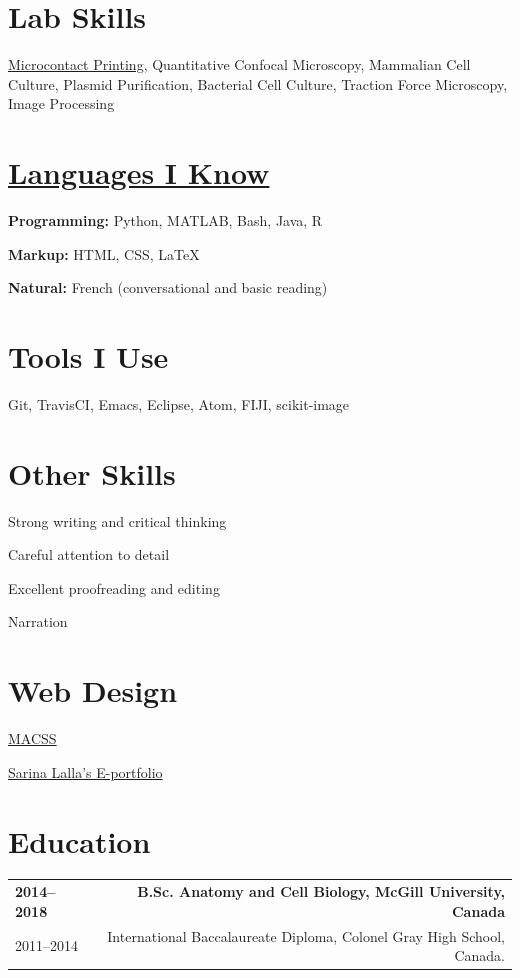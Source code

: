 \documentclass[%
	12pt,%
	]
	{article}
\begin{document}
\section*{Lab Skills}

\href{https://jidicula.github.io/images/micropattern.jpg}{Microcontact Printing}, Quantitative Confocal Microscopy, Mammalian Cell Culture, Plasmid Purification, Bacterial Cell Culture, Traction Force Microscopy, Image Processing


\section*{\href{https://github.com/jidicula}{Languages I Know}}

\textbf{Programming:} Python, MATLAB, Bash, Java, R

\textbf{Markup:} HTML, CSS, LaTeX

\textbf{Natural:} French (conversational and basic reading)

\section*{Tools I Use}

Git, TravisCI, Emacs, Eclipse, Atom, FIJI, scikit-image

\section*{Other Skills}

Strong writing and critical thinking

Careful attention to detail

Excellent proofreading and editing

Narration

\section*{Web Design}
\href{https://jidicula.github.io/macssmcgill/index.html}{MACSS}

\href{https://sarinalalla.github.io/}{Sarina Lalla's E-portfolio}

\section*{Education}
\begin{tabular}{LR}
{\bf 2014--2018}&{\bf B.Sc. Anatomy and Cell Biology, McGill University, Canada}\\[5pt]
2011--2014&International Baccalaureate Diploma, Colonel Gray High School, Canada.\\
\end{tabular}
\end{document}
